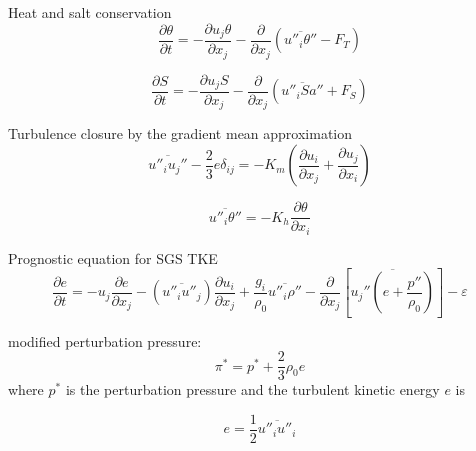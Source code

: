 \documentclass[letterpaper,10pt]{report}
\begin{document}
	Heat and salt conservation
	\begin{equation} \label{eq:ptprog}
	\frac{\partial \theta}{\partial t} = -\frac{\partial u_j \theta}{\partial x_j} - \frac{\partial}{\partial x_j}(\overline{u''_i \theta''} - F_T)
	\end{equation}
	
	\begin{equation} \label{eq:saprog}
	\frac{\partial S}{\partial t} = -\frac{\partial u_j S}{\partial x_j} - \frac{\partial}{\partial x_j}(\overline{u''_i Sa''} + F_S)
	\end{equation}
	
	Turbulence closure by the gradient mean approximation
	\begin{equation} \label{eq:momdiff}
	\overline{u''_i u_j''} - \frac{2}{3}e \delta_{ij} = -K_m(\frac{\partial u_i}{\partial x_j} + \frac{\partial u_j}{\partial x_i})
	\end{equation}
	
	\begin{equation} \label{eq:ptdiff}
	\overline{u''_i \theta''} = -K_h \frac{\partial \theta}{\partial x_i}
	\end{equation}
	
	
	Prognostic equation for SGS TKE
	\begin{equation} \label{eq:eprog}
	\frac{\partial e}{\partial t} = 
	-u_j \frac{\partial e}{\partial x_j} 
	- (\overline{u''_i u''_j})\frac{\partial u_i}{\partial x_j}
	+ \frac{g_i}{\rho_0}\overline{u''_i \rho''}
	- \frac{\partial}{\partial x_j}[\overline{u_j''(e+\frac{p''}{\rho_0})}]
	- \varepsilon
	\end{equation}
	
	modified perturbation pressure:
	\begin{equation} \label{eq:pi}
	\pi^* = p^* + \frac{2}{3}\rho_0 e
	\end{equation}
	where $p^*$ is the perturbation pressure and the turbulent kinetic energy $e$ is

	\begin{equation} \label{eq:e}
	e = \frac{1}{2}\overline{u''_i u''_i}
	\end{equation}
	
\end{document}
